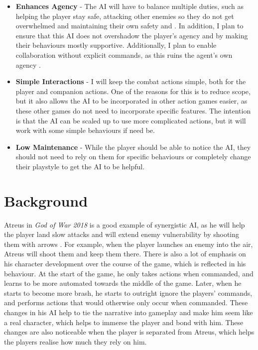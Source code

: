 \documentclass{IEEEtran}
\begin{document}
\begin{itemize}
	\item \textbf{Enhances Agency} - The AI will have to balance multiple duties, such as helping the player stay safe, attacking other enemies so they do not get overwhelmed and maintaining their own safety \cite{CoupledEmpowermentMaximisation} and \cite{tremblay2013adaptive}. In addition, I plan to ensure that this AI does not overshadow the player’s agency \cite{CoupledEmpowermentMaximisation} and \cite{DesignDocAIAllies} by making their behaviours mostly supportive. Additionally, I plan to enable collaboration without explicit commands, as this ruins the agent’s own agency \cite{EGXCharacterDeathGuildWars}.
	\item \textbf{Simple Interactions} - I will keep the combat actions simple, both for the player and companion actions. One of the reasons for this is to reduce scope, but it also allows the AI to be incorporated in other action games easier, as these other games do not need to incorporate specific features. The intention is that the AI can be scaled up to use more complicated actions, but it will work with some simple behaviours if need be.
	\item \textbf{Low Maintenance} - While the player should be able to notice the AI, they should not need to rely on them for specific behaviours or completely change their playstyle to get the AI to be helpful.
\end{itemize}
 
\section{Background}
\label{Background}

Atreus in \textit{God of War 2018} is a good example of synergistic AI, as he will help the player land slow attacks and will extend enemy vulnerability by shooting them with arrows \cite{GDCAtreus}. For example, when the player launches an enemy into the air, Atreus will shoot them and keep them there. There is also a lot of emphasis on his character development over the course of the game, which is reflected in his behaviour. At the start of the game, he only takes actions when commanded, and learns to be more automated towards the middle of the game. Later, when he starts to become more brash, he starts to outright ignore the players’ commands, and performs actions that would otherwise only occur when commanded. These changes in his AI help to tie the narrative into gameplay and make him seem like a real character, which helps to immerse the player and bond with him. These changes are also noticeable when the player is separated from Atreus, which helps the players realise how much they rely on him.
\end{document}
